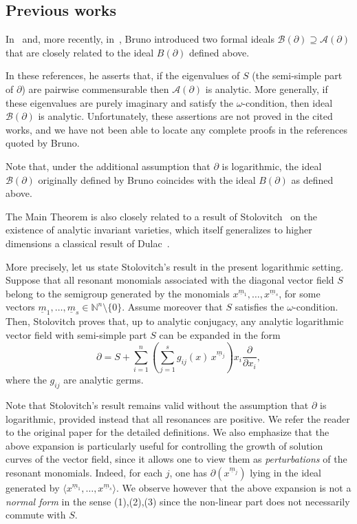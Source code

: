 \documentclass[10pt,twoside,reqno]{amsart}
\theoremstyle{remark}
\theoremstyle{remark}
\newcommand{\um}{{\underline m}}
\begin{document}
\subsection{Previous works}
In~\cite{Bruno1975} and, more recently, in~\cite{Bruno1989}, Bruno introduced two
formal ideals \(\mathcal B(\partial) \supseteq \mathcal A(\partial)\) that are
closely related to the ideal \(B(\partial)\) defined above. 

In these references, he asserts that, if the eigenvalues of $S$ (the semi-simple part of $\partial$) are pairwise commensurable then $\mathcal A(\partial)$ is analytic. More generally, if these eigenvalues are purely imaginary and  satisfy the \(\omega\)-condition, then ideal \(\mathcal B(\partial)\) is analytic.
Unfortunately, these assertions are not proved in the cited works, and we have
not been able to locate any complete proofs in the references quoted by Bruno. 

Note that, under the additional assumption that \(\partial\) is
logarithmic, the ideal \(\mathcal B(\partial)\) originally defined by Bruno coincides with the ideal
\(B(\partial)\) as defined above.

The Main Theorem is also closely related to a result of Stolovitch~\cite{Stolovitch1994}
on the existence of analytic invariant varieties, which itself generalizes to
higher dimensions a classical result of Dulac~\cite{Dulac1923}.  

More precisely, let us state Stolovitch’s result in the present logarithmic
setting. Suppose that all resonant monomials associated with the diagonal vector
field \(S\) belong to the semigroup generated by the monomials
\(x^{\um_1},\ldots,x^{\um_s}\), for some vectors
\(\um_1,\ldots,\um_s \in \mathbb{N}^n \setminus \{0\}\).
Assume moreover that \(S\) satisfies the \(\omega\)-condition. Then, Stolovitch proves that, up to
analytic conjugacy,  any analytic logarithmic vector field with semi-simple part
\(S\) can be expanded in the form
$$
\partial 
= S + \sum_{i=1}^n \left(  \sum_{j=1}^s g_{ij}(x)\, x^{\um_j} \right)
x_i \frac{\partial}{\partial x_i},
$$
where the  \(g_{ij}\) are analytic germs.

Note that Stolovitch’s result remains valid without the assumption that
\(\partial\) is logarithmic, provided instead that all resonances are positive. We refer the reader to the original paper for the detailed definitions.
We also emphasize that the above expansion is particularly
useful for controlling the growth of solution curves of the vector field, since
it allows one to view them as \emph{perturbations} of the resonant monomials.
Indeed, for each \(j\), one has \(\partial(x^{\um_j})\) lying in the
ideal generated by
\(\langle x^{\um_1},\ldots,x^{\um_s} \rangle\). We observe however that the above expansion is not a {\em normal form} in the sense (1),(2),(3) since the non-linear part does not necessarily commute with $S$. 
\end{document}
